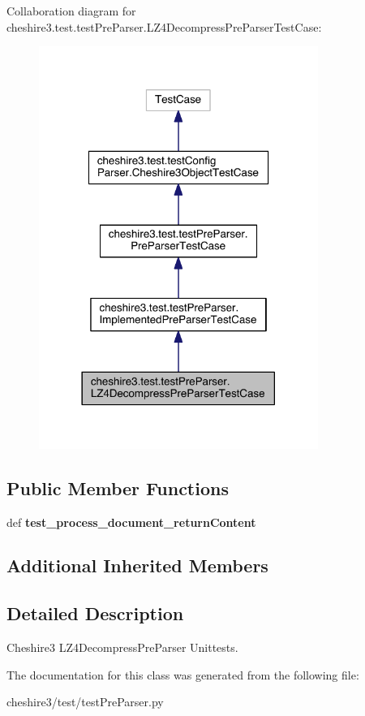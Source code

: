 Collaboration diagram for cheshire3.\-test.\-test\-Pre\-Parser.\-L\-Z4\-Decompress\-Pre\-Parser\-Test\-Case\-:
\nopagebreak
\begin{figure}[H]
\begin{center}
\leavevmode
\includegraphics[width=258pt]{classcheshire3_1_1test_1_1test_pre_parser_1_1_l_z4_decompress_pre_parser_test_case__coll__graph}
\end{center}
\end{figure}
\subsection*{Public Member Functions}
\begin{DoxyCompactItemize}
\item 
\hypertarget{classcheshire3_1_1test_1_1test_pre_parser_1_1_l_z4_decompress_pre_parser_test_case_aa71c03f53414ad5c47583232c7299d3f}{def {\bfseries test\-\_\-process\-\_\-document\-\_\-return\-Content}}\label{classcheshire3_1_1test_1_1test_pre_parser_1_1_l_z4_decompress_pre_parser_test_case_aa71c03f53414ad5c47583232c7299d3f}

\end{DoxyCompactItemize}
\subsection*{Additional Inherited Members}


\subsection{Detailed Description}
\begin{DoxyVerb}Cheshire3 LZ4DecompressPreParser Unittests.\end{DoxyVerb}
 

The documentation for this class was generated from the following file\-:\begin{DoxyCompactItemize}
\item 
cheshire3/test/test\-Pre\-Parser.\-py\end{DoxyCompactItemize}
